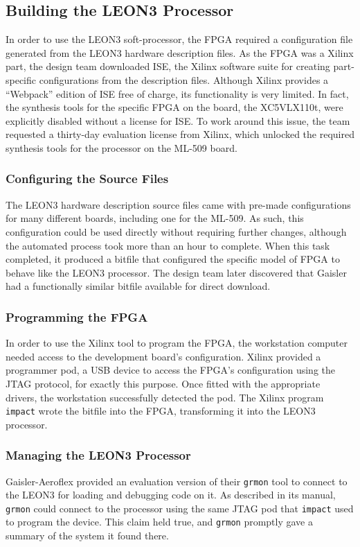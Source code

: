 \subsection{Building the LEON3 Processor}
In order to use the LEON3 soft-processor, the \ac{FPGA} required a
configuration file generated from the LEON3 hardware description files. As
the \ac{FPGA} was a Xilinx part, the design team downloaded ISE, the Xilinx
software suite for creating part-specific configurations from the
description files. Although Xilinx provides a ``Webpack'' edition of ISE
free of charge, its functionality is very limited. In fact, the synthesis
tools for the specific \ac{FPGA} on the board, the XC5VLX110t, were
explicitly disabled without a license for ISE. To work around this issue,
the team requested a thirty-day evaluation license from Xilinx, which
unlocked the required synthesis tools for the processor on the ML-509
board.

\subsubsection{Configuring the Source Files}
The LEON3 hardware description source files came with pre-made
configurations for many different boards, including one for the ML-509. As
such, this configuration could be used directly without requiring further
changes, although the automated process took more than an hour to
complete. When this task completed, it produced a bitfile that configured
the specific model of \ac{FPGA} to behave like the LEON3 processor. The
design team later discovered that Gaisler had a functionally similar
bitfile available for direct download.

\subsubsection{Programming the \ac{FPGA}}
In order to use the Xilinx tool to program the \ac{FPGA}, the workstation
computer needed access to the development board's configuration. Xilinx
provided a programmer pod, a \ac{USB} device to access the \ac{FPGA}'s
configuration using the \ac{JTAG} protocol, for exactly this purpose. Once
fitted with the appropriate drivers, the workstation successfully detected
the pod. The Xilinx program \texttt{impact} wrote the bitfile into the
\ac{FPGA}, transforming it into the LEON3 processor.

\subsubsection{Managing the LEON3 Processor}
Gaisler-Aeroflex provided an evaluation version of their \texttt{grmon}
tool to connect to the LEON3 for loading and debugging code on it. As
described in its manual, \texttt{grmon} could connect to the processor
using the same \ac{JTAG} pod that \texttt{impact} used to program the
device. This claim held true, and \texttt{grmon} promptly gave a summary of
the system it found there.

